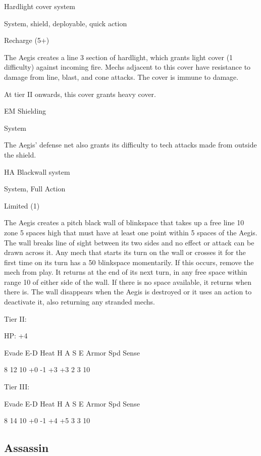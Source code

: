 Hardlight cover system
 
System, shield, deployable, quick action
 
Recharge (5+)
 
The Aegis creates a line 3 section of hardlight, which grants light cover (1 difficulty) against  
incoming fire. Mechs adjacent to this cover have resistance to damage from line, blast, and cone  
attacks. The cover is immune to damage.
 
At tier II onwards, this cover grants heavy cover.
 

EM Shielding
 
System
 
The Aegis’ defense net also grants its difficulty to tech attacks made from outside the shield.
 

HA Blackwall system
 
System, Full Action
 
Limited (1)
 
The Aegis creates a pitch black wall of blinkspace that takes up a free line 10 zone 5 spaces high  
that must have at least one point within 5 spaces of the Aegis. The wall breaks line of sight  
between its two sides and no effect or attack can be drawn across it. Any mech that starts its  
turn on the wall or crosses it for the first time on its turn has a 50%
blinkspace momentarily. If this occurs, remove the mech from play. It returns at the end of its  
next turn, in any free space within range 10 of either side of the wall. If there is no space  
available, it returns when there is. The wall disappears when the Aegis is destroyed or it uses an  
action to deactivate it, also returning any stranded mechs.
 

Tier II:
 
HP: +4
 

          Evade     E-D    Heat    H    A     S     E       Armor        Spd       Sense 

          8         12     10      +0   -1    +3    +3      2            3         10 

Tier III:
 

          Evade     E-D    Heat    H    A     S     E       Armor        Spd       Sense 

          8         14     10      +0   -1    +4    +5      3            3         10 

                                                                                                                
\subsection{Assassin}

